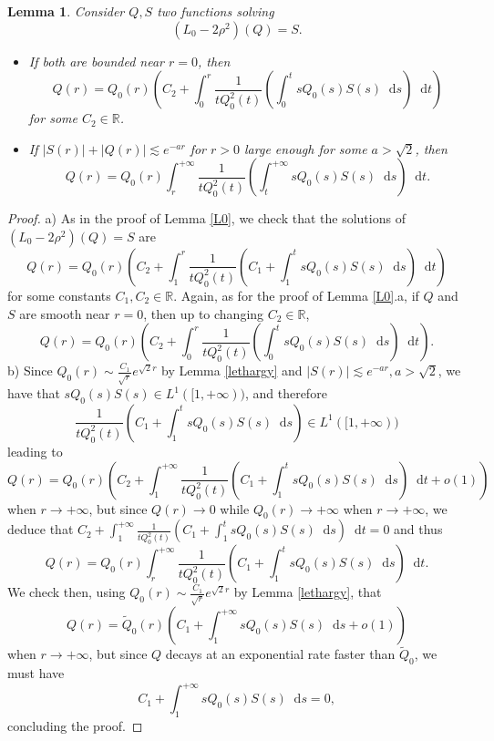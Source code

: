 \documentclass[11 pt]{amsart}
\newtheorem{lem}{Lemma}[section]
\theoremstyle{definition}
\theoremstyle{remark}
\numberwithin{equation}{section}
\newcommand{\dd}{\mathop{}\!\mathrm{d}}
\begin{document}
\begin{lem}
  \label{L0-}Consider $Q, S$ two functions solving
  \[ (L_0 - 2 \rho^2) (Q) = S. \]

\begin{itemize}
\item [a)] If both are bounded near $r = 0$, then
  \[ Q (r) = Q_0 (r) \left( C_2 + \int_0^r \frac{1}{t Q_0^2 (t)} \left(
     \int_0^t s Q_0 (s) S (s)\dd s\right)\dd t  \right) \]
  for some $C_2 \in \mathbb{R}$.
\medskip

\item [b)] If $| S (r) | + | Q (r) | \lesssim e^{- a r}$ for $r > 0$ large enough
  for some $a > \sqrt{2}$, then
  \[ Q (r) = Q_0 (r) \int_r^{+ \infty} \frac{1}{t Q_0^2 (t)} \left( \int_t^{+
     \infty} s Q_0 (s) S (s)\dd s\right)\dd t . \]
\end{itemize}
\end{lem}

\begin{proof}
  a) As in the proof of Lemma \ref{L0}, we check that the solutions of $(L_0 - 2
  \rho^2) (Q) = S$ are
  \[ Q (r) = Q_0 (r) \left( C_2 + \int_1^r \frac{1}{t Q_0^2 (t)} \left( C_1 +
     \int_1^t s Q_0 (s) S (s)\dd s\right)\dd t  \right) \]
  for some constants $C_1, C_2 \in \mathbb{R}$. Again, as for the proof of Lemma
  \ref{L0}.a, if $Q$ and $S$ are smooth near $r = 0$, then up to changing $C_2
  \in \mathbb{R}$,
  \[ Q (r) = Q_0 (r) \left( C_2 + \int_0^r \frac{1}{t Q_0^2 (t)} \left(
     \int_0^t s Q_0 (s) S (s)\dd s\right)\dd t  \right) . \]
  b) Since $Q_0 (r) \sim \frac{C_1}{\sqrt{r}} e^{\sqrt{2} r}$ by Lemma
  \ref{lethargy} and $| S (r) | \lesssim e^{- a r}, a > \sqrt{2}$, we have
  that $s Q_0 (s) S (s) \in L^1 ([1, + \infty ))$, and therefore
  \[ \frac{1}{t Q_0^2 (t)} \left( C_1 + \int_1^t s Q_0 (s) S (s)\dd s\right)
     \in L^1 ([1, + \infty )) \]
  leading to
  \[ Q (r) = Q_0 (r) \left( C_2 + \int_1^{+ \infty} \frac{1}{t Q_0^2 (t)}
     \left( C_1 + \int_1^t s Q_0 (s) S (s)\dd s\right)\dd t +o(1) \right) \]
  when $r \rightarrow + \infty$, but since $Q (r) \rightarrow 0$ while $Q_0
  (r) \rightarrow + \infty$ when $r \rightarrow + \infty$, we deduce that $C_2
  + \int_1^{+ \infty} \frac{1}{t Q_0^2 (t)} \left( C_1 + \int_1^t s Q_0 (s) S
  (s)\dd s\right)\dd t  = 0$ and thus
  \[ Q (r) = Q_0 (r) \int_r^{+ \infty} \frac{1}{t Q_0^2 (t)} \left( C_1 +
     \int_1^t s Q_0 (s) S (s)\dd s\right)\dd t . \]
  We check then, using $Q_0 (r) \sim \frac{C_1}{\sqrt{r}} e^{\sqrt{2} r}$ by
  Lemma \ref{lethargy}, that
  \[ Q (r) = \widetilde{Q}_0 (r) \left( C_1 + \int_1^{+ \infty} s Q_0 (s) S (s)
    \dd s +o(1)\right) \]
  when $r \rightarrow + \infty$, but since $Q$ decays at an exponential rate
  faster than $\widetilde{Q}_0$, we must have
  \[ C_1 + \int_1^{+ \infty} s Q_0 (s) S (s)\dd s= 0, \]
  concluding the proof.
\end{proof}
\end{document}
